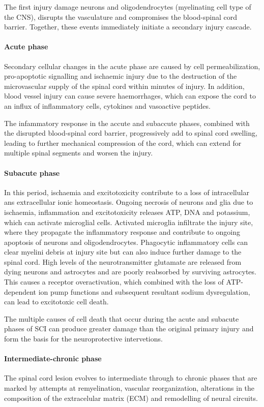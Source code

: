\documentclass[12pt,article,oneside,a4paper]{memoir}
\begin{document}
The first injury damage neurons and oligodendrocytes (myelinating cell type of
the CNS), disrupts the vasculature and compromises the blood-spinal cord barrier.
Together, these events immediately initiate a secondary injury cascade.

\paragraph{Acute phase}
Secondary cellular changes in the acute phase are caused by cell
permeabilization, pro-apoptotic signalling and ischaemic injury due to the
destruction of the microvascular supply of the spinal cord within minutes of
injury. In addition, blood vessel injury can cause severe haemorrhages, which
can expose the cord to an influx of inflammatory cells, cytokines and vasoactive
peptides.

The infammatory response in the accute and subaccute phases, combined with the
disrupted blood-spinal cord barrier, progressively add to spinal cord swelling,
leading to further mechanical compression of the cord, which can extend for
multiple spinal segments and worsen the injury.

\paragraph{Subacute phase}
In this period, ischaemia and excitotoxicity contribute to a loss of
intracellular ans extracellular ionic homeostasis. Ongoing necrosis of neurons
and glia due to ischaemia, inflammation and excitotoxicity releases ATP, DNA
and potassium, which can activate microglial cells. Activated microglia
infiltrate the injury site, where they propagate the inflammatory response and
contribute to ongoing apoptosis of neurons and oligodendrocytes. Phagocytic
inflammatory cells can clear myelini debris at injury site but can also induce
further damage to the spinal cord. High levels of the neurotransmitter glutamate
are released from dying neurons and astrocytes and are poorly reabsorbed by
surviving astrocytes. This causes a receptor overactivation, which combined with
the loss of ATP-dependent ion pump functions and subsequent resultant sodium
dysregulation, can lead to excitotoxic cell death.

The multiple causes of cell death that occur during the acute and subacute
phases of SCI can produce greater damage than the original primary injury and
form the basis for the neuroprotective intervetions.

\paragraph{Intermediate-chronic phase}
The spinal cord lesion evolves to intermediate through to chronic phases that
are marked by attempts at remyelination, vascular reorganization, alterations
in the composition of the extracelular matrix (ECM) and remodelling of neural
circuits.
\end{document}
